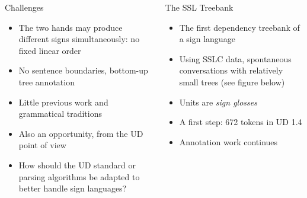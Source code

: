 \documentclass[final]{beamer}
\begin{document}
\begin{frame}{}
\begin{columns}[t]
\begin{column}{.48\linewidth}
            \begin{block}{\large Challenges}
                \begin{itemize}
                    \item The two hands may produce different signs
                        simultaneously: no fixed linear order
                    \item No sentence boundaries, bottom-up tree annotation
                    \item Little previous work and grammatical traditions
                    \item Also an opportunity, from the UD point of view
                    \item How should the UD standard or parsing algorithms be
                        adapted to better handle sign languages?
                \end{itemize}
            \end{block}


        \end{column}

        \begin{column}{.48\linewidth}

            \begin{block}{\large The SSL Treebank}
                \begin{itemize}
                    \item The first dependency treebank of a sign language
                    \item Using SSLC data, spontaneous
                        conversations with relatively small trees (see
                        figure below)
                    \item Units are \emph{sign glosses}
                    \item A first step: 672 tokens in UD 1.4
                    \item Annotation work continues
                \end{itemize}
            \end{block}


\end{column}
\end{columns}
\end{frame}
\end{document}
